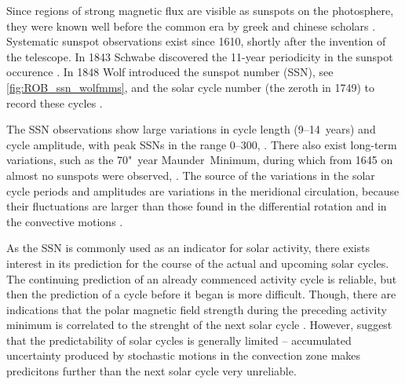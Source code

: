 Since regions of strong magnetic flux are visible as sunspots on the photosphere, they were known well before the common era by greek and chinese scholars \citep{Vaquero2007,Clark1978}. %
Systematic sunspot observations exist since 1610, shortly after the invention of the telescope. In 1843 Schwabe discovered the 11-year periodicity in the sunspot occurence \citep[p.~124]{Schroeder2004}. In 1848 Wolf introduced the sunspot number (SSN), see \autoref{fig:ROB_ssn_wolfmms}, and the solar cycle number (the zeroth in 1749) to record these cycles \citep{Hathaway2015}.
\begin{figure}[htb]
\end{figure}
The SSN observations show large variations in cycle length (9--14~years) and cycle amplitude, with peak SSNs in the range 0--300, \citep{Hathaway2015}. There also exist long-term variations, such as the 70"~year Maunder~Minimum, during which from 1645 on almost no sunspots were observed, \citep{Maunder1890}. The source of the variations in the solar cycle periods and amplitudes are variations in the meridional circulation, because their fluctuations are larger than those found in the differential rotation and in the convective motions \citep{Hathaway2015}.

As the SSN is commonly used as an indicator for solar activity, there exists interest in its prediction for the course of the actual and upcoming solar cycles. The continuing prediction of an already commenced activity cycle is reliable, but then the prediction of a cycle before it began is more difficult. Though, there are indications that the polar magnetic field strength during the preceding activity minimum is correlated to the strenght of the next solar cycle \citep{Schatten1987}. However, \citet{Hathaway2016} suggest that the predictability of solar cycles is generally limited -- accumulated uncertainty produced by stochastic motions in the convection zone makes predicitons further than the next solar cycle very unreliable.


